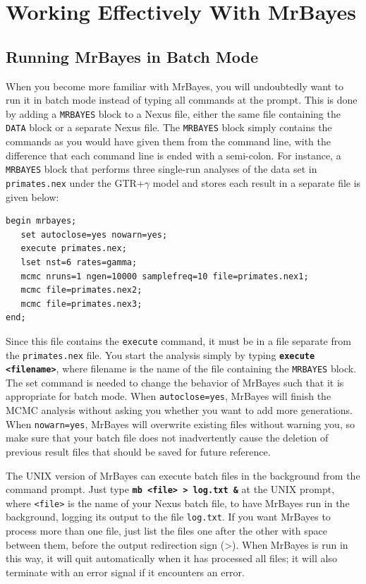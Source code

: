 \documentclass[12pt]{book}
\newcommand{\ttt}[1]{\texttt{#1}}
\newcommand{\tb}[1]{\ttt{\textbf{#1}}}
\begin{document}
\section{Working Effectively With MrBayes}

\subsection{Running MrBayes in Batch Mode}

When you become more familiar with MrBayes, you will undoubtedly want to run it
in batch mode instead of typing all commands at the prompt. This is done by
adding a \ttt{MRBAYES} block to a Nexus file, either the same file containing
the \ttt{DATA} block or a separate Nexus file. The \ttt{MRBAYES} block simply
contains the commands as you would have given them from the command line, with
the difference that each command line is ended with a semi-colon. For instance,
a \ttt{MRBAYES} block that performs three single-run analyses of the data set
in \ttt{primates.nex} under the GTR+$\gamma$ model and stores each result in a
separate file is given below:

\begin{singlespacing}
\footnotesize
\begin{verbatim}
begin mrbayes;
   set autoclose=yes nowarn=yes;
   execute primates.nex;
   lset nst=6 rates=gamma;
   mcmc nruns=1 ngen=10000 samplefreq=10 file=primates.nex1;
   mcmc file=primates.nex2;
   mcmc file=primates.nex3;
end;
\end{verbatim}
\normalsize
\end{singlespacing}

Since this file contains the \ttt{execute} command, it must be in a file separate from the
\ttt{primates.nex} file. You start the analysis simply by typing \tb{execute <filename>}, where
filename is the name of the file containing the \ttt{MRBAYES} block. The set command is needed to
change the behavior of MrBayes such that it is appropriate for batch mode. When
\ttt{autoclose=yes}, MrBayes will finish the MCMC analysis without asking you whether you want to
add more generations. When \ttt{nowarn=yes}, MrBayes will overwrite existing files without warning
you, so make sure that your batch file does not inadvertently cause the deletion of previous result
files that should be saved for future reference.

The UNIX version of MrBayes can execute batch files in the background from the command prompt. Just
type \tb{mb <file> > log.txt \&} at the UNIX prompt, where \ttt{<file>} is the name of your Nexus
batch file, to have MrBayes run in the background, logging its output to the file \ttt{log.txt}. If
you want MrBayes to process more than one file, just list the files one after the other with space
between them, before the output redirection sign (>). When MrBayes is run in this way, it will quit
automatically when it has processed all files; it will also terminate with an error signal if it
encounters an error.
\end{document}
